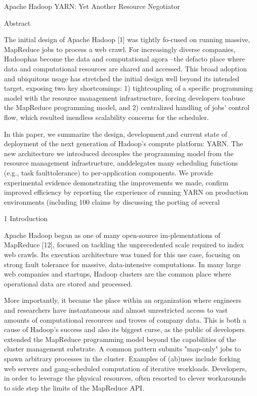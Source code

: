 Apache Hadoop YARN: Yet Another Resource Negotiator

Abstract

The initial design of Apache Hadoop [1] was tightly fo-cused on running massive,
MapReduce jobs to process a web crawl.
For increasingly diverse companies, Hadoophas become the data and computational
agora --the defacto place where data and computational resources are shared and
accessed. 
This broad adoption and ubiquitous usage has stretched the initial design well
beyond its intended target, exposing two key shortcomings: 1) tightcoupling of
a specific programming model with the resource management infrastructure,
forcing developers toabuse the MapReduce programming model, and 2) centralized
handling of jobs' control flow, which resulted inendless scalability concerns
for the scheduler.

In this paper, we summarize the design, development,and current state of
deployment of the next generation of Hadoop's compute platform: YARN.
The new architecture we introduced decouples the programming model from the
resource management infrastructure, anddelegates many scheduling functions
(e.g., task faulttolerance) to per-application components.
We provide experimental evidence demonstrating the improvements we made, confirm
improved efficiency by reporting the experience of running YARN on production
environments (including 100%
claims by discussing the porting of several

1 Introduction

Apache Hadoop began as one of many open-source im-plementations of MapReduce
[12], focused on tackling the unprecedented scale required to index web crawls.
Its execution architecture was tuned for this use case, focusing on strong fault
tolerance for massive, data-intensive computations.
In many large web companies and startups, Hadoop clusters are the common place
where operational data are stored and processed.

More importantly, it became the place within an organization where engineers and
researchers have instantaneous and almost unrestricted access to vast amounts of
computational resources and troves of company data.
This is both a cause of Hadoop's success and also its biggest curse, as the
public of developers extended the MapReduce programming model beyond the
capabilities of the cluster management substrate. 
A common pattern submits "map-only" jobs to spawn arbitrary processes in the
cluster.
Examples of (ab)uses include forking web servers and gang-scheduled computation
of iterative workloads. 
Developers, in order to leverage the physical resources, often resorted to
clever workarounds to side step the limits of the MapReduce API.

